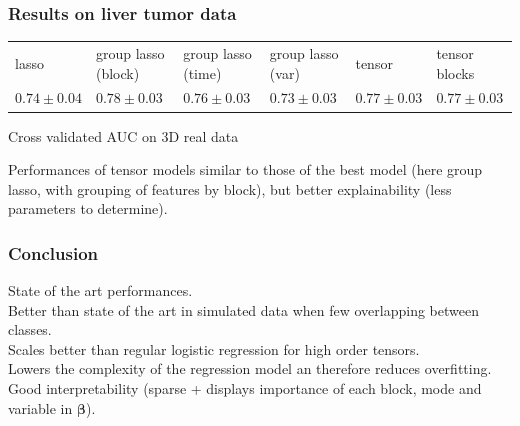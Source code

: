 \documentclass{beamer}
\begin{document}
\begin{frame}
    \frametitle{Results on liver tumor data}
    \begin{table}[H]
        \centering
        \label{tab:result_real}
        \renewcommand{\arraystretch}{1.2} 
        \begin{adjustbox}{center}
        \begin{tabular}{|>{\centering\arraybackslash}m{1.1cm}|>{\centering\arraybackslash}m{1.8cm}|>{\centering\arraybackslash}m{1.8cm}|>{\centering\arraybackslash}m{1.8cm}|>{\centering\arraybackslash}m{1.1cm}|>{\centering\arraybackslash}m{1.1cm}|}
            \cline{1-6}
             lasso & group lasso (block) & group lasso (time)& group lasso (var) & tensor & tensor blocks\\
            \cline{1-6} 
             $0.74 \pm 0.04$& $0.78 \pm 0.03$ & $0.76 \pm 0.03$ & $0.73 \pm 0.03$ & $0.77 \pm 0.03$ & $0.77 \pm 0.03$ \\
            \cline{1-6}
        \end{tabular}
        
    \end{adjustbox}
    \parbox{0.9\textwidth}{
    \vspace{0.2 cm}    
    \centering \small Cross validated AUC on 3D real data}
    \vspace{0.3 cm}
    \end{table}

    Performances of tensor models similar to those of the best model (here group lasso, with grouping of features by block), but better explainability (less parameters to determine).
\end{frame}

\begin{frame}
    \frametitle{Conclusion}
    State of the art performances.\\[15 pt]
    Better than state of the art in simulated data when few overlapping between classes.\\[15 pt]
    Scales better than regular logistic regression for high order tensors.\\[15 pt]
    Lowers the complexity of the regression model an therefore reduces overfitting.\\[15 pt]
    Good interpretability (sparse + displays importance of each block, mode and variable in $\bm{\beta}$).

\end{frame}

\end{document}
